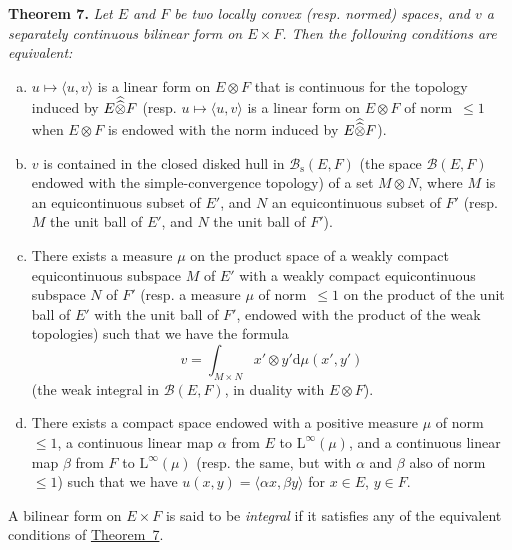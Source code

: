 \documentclass{article}
\theoremstyle{plain}
\newenvironment{itenv}[1]
  {\phantomsection\par\medskip\noindent\textbf{#1.}\itshape}
  {\medskip}
\newcommand{\LL}{\mathrm{L}}
\newcommand{\sBB}{\mathscr{B}}
\newcommand{\hhotimes}{\skew{0}{\widehat}{\skew{0}\widehat{\otimes}}}
\newcommand{\dd}{\mathrm{d}}
\newcommand{\oldpage}[1]{\marginpar{\footnotesize$\Big\vert$ \textit{p.~#1}}}
\begin{document}
\begin{itenv}{Theorem 7}
\label{1.theorem7}
  Let $E$ and $F$ be two locally convex (resp. normed) spaces, and $v$ a separately continuous bilinear form on $E\times F$.
  Then the following conditions are equivalent:
  \begin{enumerate}[a)]
    \item $u\mapsto\langle u,v\rangle$ is a linear form on $E\otimes F$ that is continuous for the topology induced by $E\hhotimes F$ (resp. $u\mapsto\langle u,v\rangle$ is a linear form on $E\otimes F$ of norm~$\leq1$ when $E\otimes F$ is endowed with the norm induced by $E\hhotimes F$).
    \item $v$ is contained in the closed disked hull in $\sBB_\mathrm{s}(E,F)$ (the space $\sBB(E,F)$ endowed with the simple-convergence topology) of a set $M\otimes N$, where $M$ is an equicontinuous subset of $E'$, and $N$ an equicontinuous subset of $F'$ (resp. $M$ the unit ball of $E'$, and $N$ the unit ball of $F'$).
    \item There exists a measure $\mu$ on the product space of a weakly compact equicontinuous subspace $M$ of $E'$ with a weakly compact equicontinuous subspace $N$ of $F'$ (resp. a measure $\mu$ of norm~$\leq1$ on the product of the unit ball of $E'$ with the unit ball of $F'$, endowed with the product of the weak topologies) such that we have the formula
      \[
        v = \int_{M\times N} x'\otimes y' \dd\mu(x',y')
      \]
      (the weak integral in $\sBB(E,F)$, in duality with $E\otimes F$).
    \item There exists a compact space endowed with a positive measure $\mu$ of norm~$\leq1$, a continuous linear map $\alpha$ from $E$ to $\LL^\infty(\mu)$, and a continuous linear map $\beta$ from $F$ to $\LL^\infty(\mu)$ (resp. the same, but with $\alpha$ and $\beta$
\oldpage{88}
      also of norm~$\leq1$) such that we have $u(x,y)=\langle\alpha x,\beta y\rangle$ for $x\in E$, $y\in F$.
  \end{enumerate}
\end{itenv}

A bilinear form on $E\times F$ is said to be \emph{integral} if it satisfies any of the equivalent conditions of \hyperref[1.theorem7]{Theorem~7}.






\nocite{*}
\end{document}
